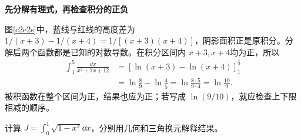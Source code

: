 \begin{solution}
\par\medskip{}\noindent\textbf{先分解有理式，再检查积分的正负}\par\nobreak
图\ref{c2e2s}中，蓝线与红线的高度差为 $1/(x+3)-1/(x+4)=1/[(x+3)(x+4)]$，阴影面积正是原积分。分解后两个函数都是已知的对数导数。在积分区间内 $x+3,x+4$均为正，所以
\begin{align*}
\int_1^5\frac{\dd x}{x^2+7x+12}
 &=[\ln(x+3)-\ln(x+4)]_1^5\\
 &=\ln\frac89-\ln\frac45
 =\ln\frac{8\cdot5}{9\cdot4}
 =\boxed{\ln\frac{10}9}.
\end{align*}
被积函数在整个区间为正，结果也应为正；若写成 $\ln(9/10)$，就应检查上下限相减的顺序。
\end{solution}

\begin{question}
\begin{example}[四分之一圆的面积积分]
计算 $J=\int_0^1\sqrt{1-x^2}\dd x$，分别用几何和三角换元解释结果。
\end{example}
\end{question}
